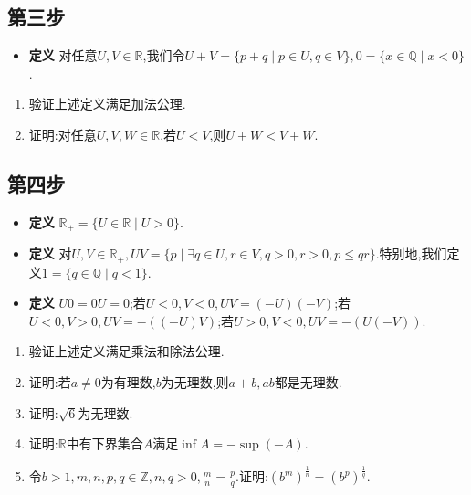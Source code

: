 \documentclass[
  a4paper,
]{ctexart}
\providecommand{\tightlist}{\setlength{\itemsep}{0pt}\setlength{\parskip}{0pt}}
\begin{document}
\subsection{第三步}\label{ux7b2cux4e09ux6b65}

\begin{itemize}
\tightlist
\item
  \textbf{定义}
  对任意\(U,V \in \mathbb{R}\),我们令\(U+V=\{ p+q \mid p \in U,q \in V \},0=\{ x \in \mathbb{Q} \mid x<0 \}\).
\end{itemize}

\begin{enumerate}
\def\labelenumi{\arabic{enumi}.}
\setcounter{enumi}{3}
\tightlist
\item
  验证上述定义满足加法公理.
\item
  证明:对任意\(U,V,W \in \mathbb{R}\),若\(U<V\),则\(U+W<V+W\).
\end{enumerate}

\subsection{第四步}\label{ux7b2cux56dbux6b65}

\begin{itemize}
\tightlist
\item
  \textbf{定义} \(\mathbb{R}_+=\{ U \in \mathbb{R} \mid U > 0 \}\).
\item
  \textbf{定义}
  对\(U,V \in \mathbb{R}_+,UV=\{ p \mid \exists q \in U,r \in V,q>0,r>0,p \leq qr \}\).特别地,我们定义\(1=\{ q\in\mathbb{Q} \mid q<1 \}\).
\item
  \textbf{定义}
  \(U0=0U=0\);若\(U<0,V<0,UV=(-U)(-V)\);若\(U<0,V>0,UV=-((-U)V)\);若\(U>0,V<0,UV=-(U(-V))\).
\end{itemize}

\begin{enumerate}
\def\labelenumi{\arabic{enumi}.}
\setcounter{enumi}{5}
\tightlist
\item
  验证上述定义满足乘法和除法公理.
\item
  证明:若\(a\neq0\)为有理数,\(b\)为无理数,则\(a+b,ab\)都是无理数.
\item
  证明:\(\sqrt6\)为无理数.
\item
  证明:\(\mathbb{R}\)中有下界集合\(A\)满足\(\inf A=-\sup(-A)\).
\item
  令\(b>1,m,n,p,q \in \mathbb{Z},n,q>0,\frac{m}{n}=\frac{p}{q}\).证明:\((b^m)^\frac{1}{n}=(b^p)^\frac{1}{q}\).
\end{enumerate}
\end{document}
